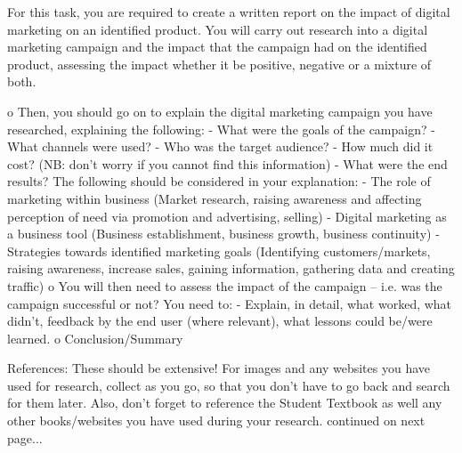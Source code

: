 \documentclass{article}
\begin{document}
For this task, you are required to create a written report on the impact of digital marketing on an identified
product. You will carry out research into a digital marketing campaign and the impact that the campaign had
on the identified product, assessing the impact whether it be positive, negative or a mixture of both.


o Then, you should go on to explain the digital marketing campaign you have researched, explaining
the following:
- What were the goals of the campaign?
- What channels were used?
- Who was the target audience?
- How much did it cost? (NB: don’t worry if you cannot find this information)
- What were the end results?
The following should be considered in your explanation:
- The role of marketing within business (Market research, raising awareness and affecting perception of
need via promotion and advertising, selling)
- Digital marketing as a business tool (Business establishment, business growth, business continuity)
- Strategies towards identified marketing goals (Identifying customers/markets, raising awareness,
increase sales, gaining information, gathering data and creating traffic)
o You will then need to assess the impact of the campaign – i.e. was the campaign successful or
not? You need to:
- Explain, in detail, what worked, what didn’t, feedback by the end user (where relevant),
what lessons could be/were learned.
o Conclusion/Summary


References:
These should be extensive! For images and any websites you have used for research, collect as you go, so
that you don’t have to go back and search for them later. Also, don’t forget to reference the Student
Textbook as well any other books/websites you have used during your research.
continued on next page...


\end{document}
